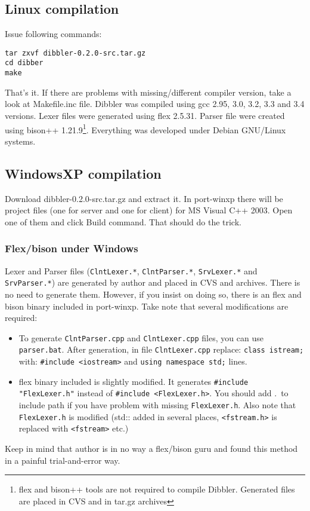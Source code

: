 \subsection{Linux compilation}
Issue following commands:
\begin{verbatim}
tar zxvf dibbler-0.2.0-src.tar.gz
cd dibber
make
\end{verbatim}
That's it. If there are problems with missing/different compiler
version, take a look at Makefile.inc file. Dibbler was compiled using
gcc 2.95, 3.0, 3.2, 3.3 and 3.4 versions. Lexer files were generated using
flex 2.5.31. Parser file were created using bison++
1.21.9\footnote{flex and bison++ tools are not required to compile
  Dibbler. Generated files are placed in CVS and in tar.gz
  archives}. Everything was developed under Debian GNU/Linux systems.

\subsection{WindowsXP compilation}
Download dibbler-0.2.0-src.tar.gz and extract it. In port-winxp there
will be project files (one for server and one for client) for MS
Visual C++ 2003. Open one of them and click Build command. That should
do the trick.

\subsubsection{Flex/bison under Windows}

Lexer and Parser files (\verb+ClntLexer.*+, \verb+ClntParser.*+, \verb+SrvLexer.*+ and
\verb+SrvParser.*+) are generated by author and placed in CVS and
archives. There is no need to generate them. However, if you insist on
doing so, there is an flex and bison binary included in port-winxp. Take note that
several modifications are required:

\begin{itemize}
\item To generate \verb+ClntParser.cpp+ and \verb+ClntLexer.cpp+ files, you can use
\verb+parser.bat+. After generation, in file \verb+ClntLexer.cpp+ replace: \verb+class istream;+
with: \verb+#include <iostream>+ and \verb+using namespace std;+ lines.
\item flex binary included is slightly modified. It generates
\verb+#include "FlexLexer.h"+ instead of \verb+#include <FlexLexer.h>+. You should
add .\ to include path if you have problem with missing \verb+FlexLexer.h+.
Also note that \verb+FlexLexer.h+ is modified (std:: added in several places,
\verb+<fstream.h>+ is replaced with \verb+<fstream>+ etc.)
\end{itemize}

Keep in mind that author is in no way a flex/bison guru and found this method
in a painful trial-and-error way. 
